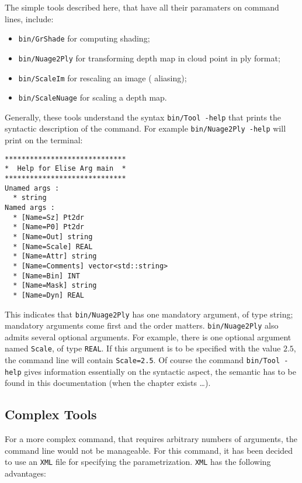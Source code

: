 The simple tools described here, that have all their paramaters on command lines,
include:

\begin{itemize}
    \item {\tt bin/GrShade} for computing shading;
    \item {\tt bin/Nuage2Ply} for transforming depth map in cloud point in ply format;
    \item {\tt bin/ScaleIm} for rescaling an image ( aliasing); %
    \item {\tt bin/ScaleNuage} for scaling a depth map.
\end{itemize}

Generally, these tools understand the syntax {\tt bin/Tool -help} that prints the syntactic
description of the command. For example{ \tt bin/Nuage2Ply -help} will print on the terminal:

\begin{verbatim}
*****************************
*  Help for Elise Arg main  *
*****************************
Unamed args : 
  * string
Named args : 
  * [Name=Sz] Pt2dr
  * [Name=P0] Pt2dr
  * [Name=Out] string
  * [Name=Scale] REAL
  * [Name=Attr] string
  * [Name=Comments] vector<std::string>
  * [Name=Bin] INT
  * [Name=Mask] string
  * [Name=Dyn] REAL
\end{verbatim}


This indicates that {\tt bin/Nuage2Ply} has one mandatory argument, of type string;
mandatory arguments come first and the order matters. { \tt bin/Nuage2Ply}  also admits 
several optional arguments. For example, there is one optional argument named  { \tt Scale},
of type  { \tt REAL}. If this argument is to be specified with the value $2.5$,  the command
line will contain {\tt Scale=2.5}.  Of course the command  {\tt bin/Tool -help} gives information
essentially on the syntactic aspect, the semantic has to be found in this documentation
(when the chapter exists \dots).

\subsection{Complex Tools}

For a more complex command, that requires arbitrary numbers of arguments, the command line
would not be manageable. For this command, it has been decided to use an {\tt XML} file
for specifying the parametrization. {\tt XML} has the following advantages:


